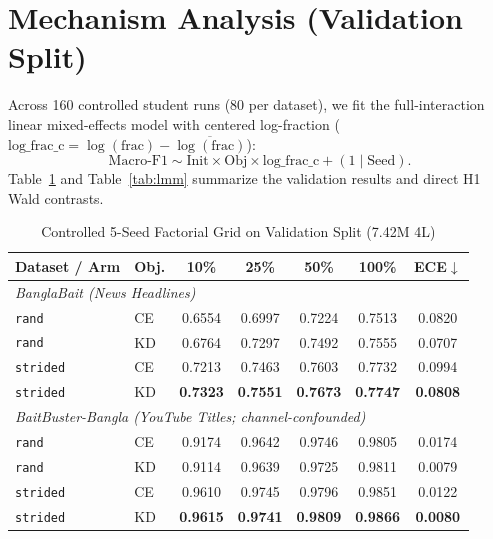 \documentclass[conference]{IEEEtran}
\begin{document}
\section{Mechanism Analysis (Validation Split)}
Across 160 controlled student runs (80 per dataset), we fit the full-interaction linear mixed-effects model with centered log-fraction ($\text{log\_frac\_c} = \log(\text{frac}) - \overline{\log(\text{frac})}$):
\begin{equation}
\text{Macro-F1} \sim \text{Init} \times \text{Obj} \times \text{log\_frac\_c} + (1 \mid \text{Seed}).
\end{equation}
Table~\ref{tab:grid} and Table~\ref{tab:lmm} summarize the validation results and direct H1 Wald contrasts.

\begin{table}[htbp]
\caption{Controlled 5-Seed Factorial Grid on Validation Split (7.42M 4L)}
\label{tab:grid}
\begin{center}
\begin{tabular}{llccccc}
\toprule
\textbf{Dataset / Arm} & \textbf{Obj.} & \textbf{10\%} & \textbf{25\%} & \textbf{50\%} & \textbf{100\%} & \textbf{ECE$\downarrow$} \\
\midrule
\multicolumn{7}{l}{\textit{BanglaBait (News Headlines)}} \\
\texttt{rand} & CE & 0.6554 & 0.6997 & 0.7224 & 0.7513 & 0.0820 \\
\texttt{rand} & KD & 0.6764 & 0.7297 & 0.7492 & 0.7555 & 0.0707 \\
\texttt{strided} & CE & 0.7213 & 0.7463 & 0.7603 & 0.7732 & 0.0994 \\
\texttt{strided} & KD & \textbf{0.7323} & \textbf{0.7551} & \textbf{0.7673} & \textbf{0.7747} & \textbf{0.0808} \\
\midrule
\multicolumn{7}{l}{\textit{BaitBuster-Bangla (YouTube Titles; channel-confounded)}} \\
\texttt{rand} & CE & 0.9174 & 0.9642 & 0.9746 & 0.9805 & 0.0174 \\
\texttt{rand} & KD & 0.9114 & 0.9639 & 0.9725 & 0.9811 & 0.0079 \\
\texttt{strided} & CE & 0.9610 & 0.9745 & 0.9796 & 0.9851 & 0.0122 \\
\texttt{strided} & KD & \textbf{0.9615} & \textbf{0.9741} & \textbf{0.9809} & \textbf{0.9866} & \textbf{0.0080} \\
\bottomrule
\end{tabular}
\end{center}
\end{table}
\end{document}
